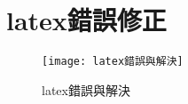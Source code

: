 \chapter{latex錯誤修正}

\begin{figure}[hbt!]
\begin{center}
\label{latex錯誤與解決}
\texttt{[image: latex錯誤與解決]}
\caption{\Large latex錯誤與解決}
\end{center}
\end{figure}
